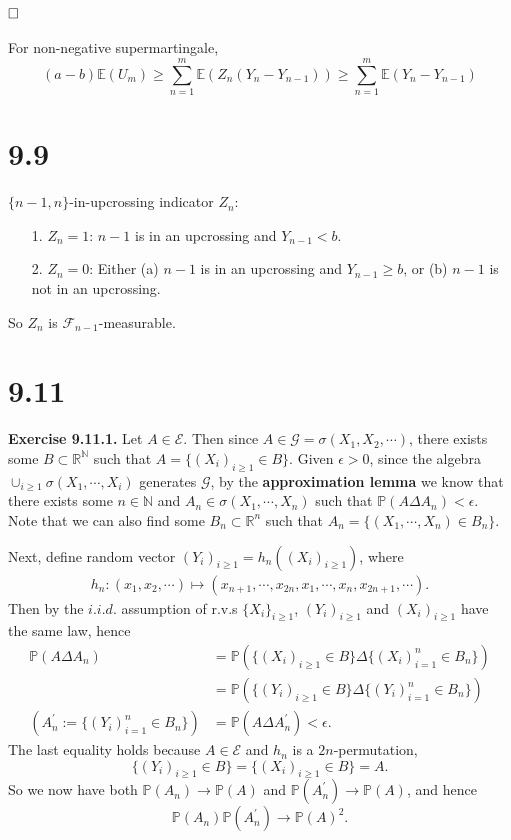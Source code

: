 \documentclass[12pt]{extarticle}
\begin{document}
$\hspace{\fill}\square$\\ \\

For non-negative supermartingale,
\begin{equation*}
(a-b)\mathbb{E}(U_m)\geq\sum_{n=1}^m\mathbb{E}(Z_n(Y_n-Y_{n-1}))\geq\sum_{n=1}^m\mathbb{E}(Y_n-Y_{n-1})
\end{equation*}


\newpage
\section*{9.9}
$\{n-1,n\}$-in-upcrossing indicator $Z_n$:
\begin{enumerate}
\item[1.] $Z_n=1$: $n-1$ is in an upcrossing and $Y_{n-1}<b$.
\item[2.] $Z_n=0$: Either (a) $n-1$ is in an upcrossing and $Y_{n-1}\geq b$, or (b) $n-1$ is not in an upcrossing.
\end{enumerate}
So $Z_n$ is $\mathcal{F}_{n-1}$-measurable.

\newpage

\section*{9.11}
\textbf{Exercise 9.11.1.} Let $A\in\mathcal{E}$. Then since $A\in\mathcal{G}=\sigma(X_1,X_2,\cdots)$, there exists some $B\subset\mathbb{R}^\mathbb{N}$ such that $A=\{(X_i)_{i\geq 1}\in B\}$. Given $\epsilon>0$, since the algebra $\cup_{i\geq 1}\sigma(X_1,\cdots,X_i)$ generates $\mathcal{G}$, by the \textbf{approximation lemma} we know that there exists some $n\in\mathbb{N}$ and $A_n\in\sigma(X_1,\cdots,X_n)$ such that $\mathbb{P}(A\Delta A_n)<\epsilon$. Note that we can also find some $B_n\subset \mathbb{R}^n$ such that $A_n=\{(X_1,\cdots,X_n)\in B_n\}$.

Next, define random vector $(Y_i)_{i\geq 1}=h_n((X_i)_{i\geq 1})$, where
\[
\begin{aligned}
h_n:(x_1,x_2,\cdots)\mapsto(x_{n+1},\cdots,x_{2n},x_1,\cdots,x_n,x_{2n+1},\cdots).
\end{aligned}
\]
Then by the $i.i.d.$ assumption of r.v.s $\{X_i\}_{i\geq 1}$, $(Y_i)_{i\geq 1}$ and $(X_i)_{i\geq 1}$ have the same law, hence
\[
\begin{aligned}
\mathbb{P}(A\Delta A_n) &= \mathbb{P}\left(\{(X_i)_{i\geq 1}\in B\}\Delta\{(X_i)_{i=1}^n\in B_n\}\right) \\&
=\mathbb{P}\left(\{(Y_i)_{i\geq 1}\in B\}\Delta\{(Y_i)_{i=1}^n\in B_n\}\right) \\
(A_n^\prime:=\{(Y_i)_{i=1}^n\in B_n\})
&=\mathbb{P}(A\Delta A_n^\prime)<\epsilon.
\end{aligned}
\]
The last equality holds because $A\in\mathcal{E}$ and $h_n$ is a $2n$-permutation,
\[
\{(Y_i)_{i\geq 1}\in B\}=\{(X_i)_{i\geq 1}\in B\}=A.
\]
So we now have both $\mathbb{P}(A_n)\rightarrow\mathbb{P}(A)$ and $\mathbb{P}(A_n^\prime)\rightarrow\mathbb{P}(A)$, and hence
\[
\mathbb{P}(A_n)\mathbb{P}(A_n^\prime)\rightarrow\mathbb{P}(A)^2.
\]
\end{document}
